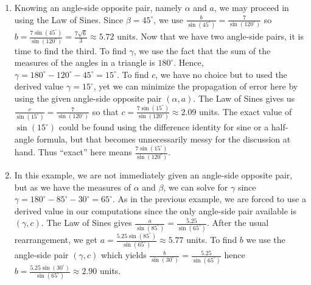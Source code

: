 {
\begin{enumerate}

\item Knowing an angle-side opposite pair, namely $\alpha$ and $a$, we may proceed in using the Law of Sines.  Since $\beta = 45^{\circ}$, we use $\frac{b}{\sin\left(45^{\circ}\right)} = \frac{7}{\sin\left(120^{\circ}\right)}$ so $b = \frac{7\sin\left(45^{\circ}\right)}{\sin\left(120^{\circ}\right)} = \frac{7\sqrt{6}}{3} \approx 5.72$ units.  Now that we have two angle-side pairs, it is time to find the third.  To find $\gamma$, we use the fact that the sum of the measures of the angles in a triangle is $180^{\circ}$. Hence, $\gamma = 180^{\circ} - 120^{\circ} - 45^{\circ} = 15^{\circ}$.  To find $c$, we have no choice but to used the derived value $\gamma = 15^{\circ}$, yet we can minimize the propagation of error here by using the given angle-side opposite pair $(\alpha, a)$. The Law of Sines gives us  $\frac{c}{\sin\left(15^{\circ}\right)} = \frac{7}{\sin\left(120^{\circ}\right)}$ so that $c = \frac{7\sin\left(15^{\circ}\right)}{\sin\left(120^{\circ}\right)} \approx 2.09$ units. The exact value of $\sin(15^{\circ})$ could be found using the difference identity for sine or a half-angle formula, but that becomes unnecessarily messy for the discussion at hand.  Thus ``exact'' here means $\frac{7\sin\left(15^{\circ}\right)}{\sin\left(120^{\circ}\right)}$.


\item In this example, we are not immediately given an angle-side opposite pair, but as we have the measures of $\alpha$ and $\beta$, we can solve for $\gamma$ since $\gamma = 180^{\circ} - 85^{\circ} - 30^{\circ} = 65^{\circ}$.  As in the previous example, we are forced to use a derived value in our computations since the only angle-side pair available is $(\gamma, c)$. The Law of Sines gives $\frac{a}{\sin\left(85^{\circ}\right)} = \frac{5.25}{\sin\left(65^{\circ}\right)}$.  After the usual rearrangement, we get $a = \frac{5.25\sin\left(85^{\circ}\right)}{\sin\left(65^{\circ}\right)} \approx 5.77$ units.    To find $b$  we use the angle-side pair $(\gamma,c)$ which yields $\frac{b}{\sin\left(30^{\circ}\right)} = \frac{5.25}{\sin\left(65^{\circ}\right)}$ hence $b = \frac{5.25\sin\left(30^{\circ}\right)}{\sin\left(65^{\circ}\right)} \approx 2.90$ units. 


\end{enumerate}}
